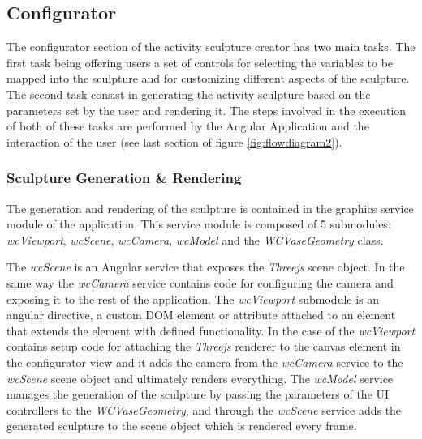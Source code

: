 \documentclass[../medieninformatik-arbeit.tex]{subfiles}
\begin{document}
\subsection{Configurator}
The configurator section of the activity sculpture creator has two main tasks. The first task being offering users a set of controls for selecting the variables to be mapped into the sculpture and for customizing different aspects of the sculpture. The second task consist in generating the activity sculpture based on the parameters set by the user and rendering it. The steps involved in the execution of both of these tasks are performed by the Angular Application and the interaction of the user (see last section of figure \ref{fig:flowdiagram2}).

\subsubsection{Sculpture Generation \& Rendering}
The generation and rendering of the sculpture is contained in the graphics service module of the application. This service module is composed of 5 submodules: \textit{wcViewport}, \textit{wcScene}, \textit{wcCamera}, \textit{wcModel} and the \textit{WCVaseGeometry} class. 

The \textit{wcScene} is an Angular service that exposes the \textit{Threejs} scene object. In the same way the \textit{wcCamera} service contains code for configuring the camera and exposing it to the rest of the application. The \textit{wcViewport} submodule is an angular directive, a custom DOM element or attribute attached to an element that extends the element with defined functionality. In the case of the \textit{wcViewport} contains setup code for attaching the \textit{Threejs} renderer to the canvas element in the configurator view and it adds the camera from the \textit{wcCamera} service to the \textit{wcScene} scene object and ultimately renders everything. The \textit{wcModel} service manages the generation of the sculpture by passing the parameters of the UI controllers to the \textit{WCVaseGeometry}, and through the \textit{wcScene} service adds the generated sculpture to the scene object which is rendered every frame. 
\end{document}
